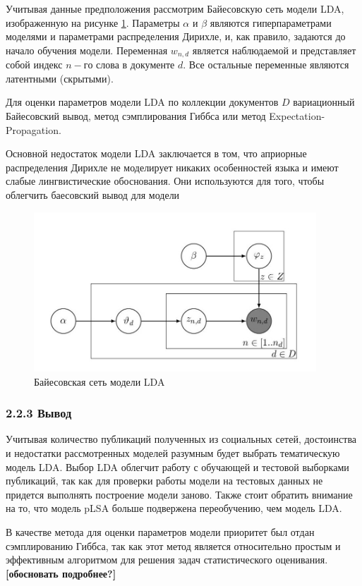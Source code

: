 \documentclass[a4paper]{report}
\begin{document}
	Учитывая данные предположения рассмотрим Байесовскую сеть модели LDA, изображенную на рисунке \ref{fig:lda}. Параметры $\alpha$ и $\beta$ являются гиперпараметрами моделями и параметрами распределения Дирихле, и, как правило, задаются до начало обучения модели. Переменная $w_{n,d}$ является наблюдаемой и представляет собой индекс $n-го$ слова в документе $d$. Все остальные переменные являются латентными (скрытыми).
	
	Для оценки параметров модели LDA по коллекции документов $D$ вариационный Байесовский вывод, метод сэмплирования Гиббса или метод Expectation-Propagation.
	
	Основной недостаток модели LDA заключается в том, что априорные распределения Дирихле не моделирует никаких особенностей языка и имеют слабые лингвистические обоснования. Они используются для того, чтобы облегчить баесовский вывод для модели \cite{bib:Voron1}
	
	
	
	\begin{figure}
		\centering
		\includegraphics[width=400px]
		{imgs/LDA.jpg}
		\caption{Байесовская сеть модели LDA}
		\label{fig:lda}
	\end{figure} 
	
	
	\subsubsection{2.2.3 Вывод}
	Учитывая количество публикаций полученных из социальных сетей, достоинства и недостатки рассмотренных моделей разумным будет выбрать тематическую модель LDA. Выбор LDA облегчит работу с обучающей и тестовой выборками публикаций, так как для проверки работы модели на тестовых данных не придется выполнять построение модели заново.  Также стоит обратить внимание на то, что модель pLSA больше подвержена переобучению, чем модель LDA.
	
	В качестве метода для оценки параметров модели приоритет был отдан сэмплированию Гиббса,  так как этот метод является относительно простым и эффективным алгоритмом для решения задач статистического оценивания. \textbf{[обосновать подробнее?]}
\end{document}
